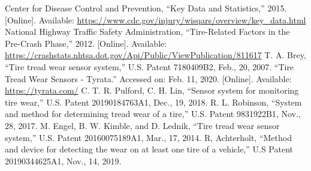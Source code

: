 \documentclass[11pt]{IEEEtran}
\begin{document}
	\begin{thebibliography}{00}
		 Center for Disease Control and Prevention, ``Key Data and Statistics,'' 2015. [Online]. Available: \url{https://www.cdc.gov/injury/wisqars/overview/key_data.html}
		 National Highway Traffic Safety Administration, ``Tire-Related Factors in the Pre-Crash Phase,'' 2012. [Online]. Available: \url{https://crashstats.nhtsa.dot.gov/Api/Public/ViewPublication/811617}
		 T. A. Brey, ``Tire tread wear sensor system,'' U.S. Patent 7180409B2, Feb., 20, 2007.
		 ``Tire Tread Wear Sensors - Tyrata.'' Accessed on: Feb. 11, 2020. [Online]. Available: \url{https://tyrata.com/}
		 C. T. R. Pulford, C. H. Lin, ``Sensor system for monitoring tire wear,'' U.S. Patent 20190184763A1, Dec., 19, 2018.
		 R. L. Robinson, ``System and method for determining tread wear of a tire,'' U.S. Patent 9831922B1, Nov., 28, 2017.
		 M. Engel, B. W. Kimble, and D. Lednik, ``Tire tread wear sensor system,'' U.S. Patent 20160075189A1, Mar., 17, 2014.
		 R, Achterholt, ``Method and device for detecting the wear on at least one tire of a vehicle,'' U.S Patent 20190344625A1, Nov., 14, 2019.
	\end{thebibliography}
\end{document}
